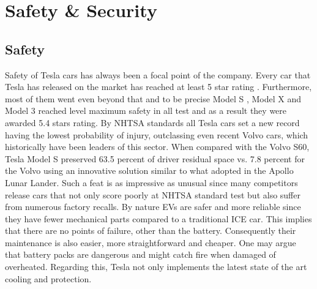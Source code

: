 \documentclass{article} %
\begin{document}




\section{Safety \& Security} %
\subsection{Safety}

Safety of Tesla cars has always been a focal point of the company.
Every car that Tesla has released on the market has reached at least 5 star rating \cite{Safety}.%
Furthermore, most of them went even beyond that and to be precise Model S \cite{ModelS-Rating} , Model X and Model 3 reached level maximum safety in all test and as a result they were awarded 5.4 stars rating.%
By NHTSA standards all Tesla cars set a new record having the lowest probability of injury, outclassing even recent Volvo cars, which historically have been leaders of this sector. When compared with the Volvo S60, Tesla Model S preserved 63.5 percent of driver residual space vs. 7.8 percent for the Volvo using an innovative solution similar to what adopted in the Apollo Lunar Lander.%
Such a feat is as impressive as unusual since many competitors release cars that not only score poorly at NHTSA standard test but also suffer from  numerous factory recalls. 
\newline 
By nature EVs are safer and more reliable since they have fewer mechanical parts compared to a traditional ICE car. This implies that there are no points of failure, other than the battery.%
Consequently their maintenance is also easier, more straightforward and cheaper.%
\newline One may argue that battery packs are dangerous and might catch fire when damaged of overheated. Regarding this, Tesla not only implements the latest state of the art cooling and protection.%
\end{document}

